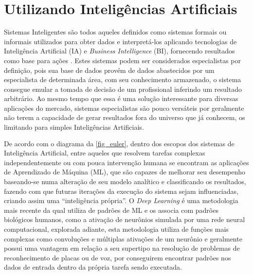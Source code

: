\section{Utilizando Intelig{\^e}ncias Artificiais}

Sistemas Inteligentes são todos aqueles definidos como sistemas
formais ou informais utilizados para obter dados e interpretá-los
aplicando tecnologias de Inteligência Artificial (IA) e \textit{Business
Intelligence} (BI), fornecendo resultados como base para ações
\cite{sharda2017}. Estes sistemas podem ser considerados especialistas
por definição, pois sua base de dados provém de dados abastecidos por
um especialista de determinada área, com seu conhecimento armazenado,
o sistema consegue emular a tomada de decisão de um profissional
inferindo um resultado arbitrário. Ao mesmo tempo que essa é uma
solução interessante para diversas aplicações do mercado, sistemas
especialistas são pouco versáteis por geralmente não terem a
capacidade de gerar resultados fora do universo que já conhecem, os
limitando para simples Inteligências Artificiais.

De acordo com o diagrama da \autoref{fig_euler}, dentro dos escopos
dos sistemas de Inteligência Artificial, entre aqueles que resolvem
tarefas complexas independentemente ou com pouca intervenção humana
\cite{russel2020} se encontram as aplicações de Aprendizado de Máquina
(ML), que são capazes de melhorar seu desempenho baseando-se numa
alteração de seu modelo analítico e classificando os resultados,
fazendo com que futuras iterações da execução do sistema sejam
influenciadas, criando assim uma “inteligência própria”. O \textit{Deep
Learning} é uma metodologia mais recente da qual utiliza de padrões de
ML e os associa com padrões biológicos humanos, como a ativação de
neurônios simulada por uma rede neural computacional, explorada
adiante, esta metodologia utiliza de funções mais complexas como
convoluções e múltiplas ativações de um neurônio \cite{janiesch2021} e
geralmente possui uma vantagem em relação a seu supertipo na resolução
de problemas de reconhecimento de placas ou de voz, por conseguirem
encontrar padrões nos dados de entrada dentro da própria tarefa sendo
executada.

